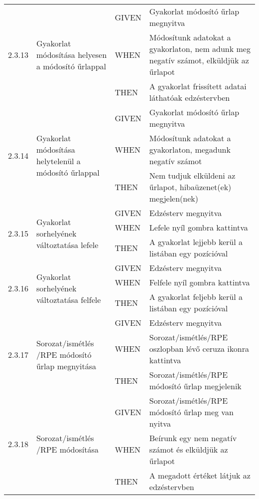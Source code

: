 \begin{center}
\begin{longtable}{ | p{} | p{} | p{} | p{} | }
			\multirow{3}{*}{2.3.13} 
			& \multirow{3}{=}{Gyakorlat módosítása helyesen a módosító űrlappal} 
			& GIVEN 
			& Gyakorlat módosító űrlap megnyitva \\
			\cline{3-4}
			& & WHEN 
			& Módosítunk adatokat a gyakorlaton, nem adunk meg negatív számot, elküldjük az űrlapot \\
			\cline{3-4}
			& & THEN 
			& A gyakorlat frissített adatai láthatóak edzéstervben \\
			\hline

			\multirow{3}{*}{2.3.14} 
			& \multirow{3}{=}{Gyakorlat módosítása helytelenül a módosító űrlappal} 
			& GIVEN 
			& Gyakorlat módosító űrlap megnyitva \\
			\cline{3-4}
			& & WHEN 
			& Módosítunk adatokat a gyakorlaton, megadunk negatív számot \\
			\cline{3-4}
			& & THEN 
			& Nem tudjuk elküldeni az űrlapot, hibaüzenet(ek) megjelen(nek) \\
			\hline

			\multirow{3}{*}{2.3.15} 
			& \multirow{3}{=}{Gyakorlat sorhelyének változtatása lefele} 
			& GIVEN 
			& Edzésterv megnyitva \\
			\cline{3-4}
			& & WHEN 
			& Lefele nyíl gombra kattintva \\
			\cline{3-4}
			& & THEN 
			& A gyakorlat lejjebb kerül a listában egy pozícióval \\
			\hline

			\multirow{3}{*}{2.3.16} 
			& \multirow{3}{=}{Gyakorlat sorhelyének változtatása felfele} 
			& GIVEN 
			& Edzésterv megnyitva \\
			\cline{3-4}
			& & WHEN 
			& Felfele nyíl gombra kattintva \\
			\cline{3-4}
			& & THEN 
			& A gyakorlat feljebb kerül a listában egy pozícióval \\
			\hline

			\multirow{3}{*}{2.3.17} 
			& \multirow{3}{=}{Sorozat/ismétlés /RPE módosító űrlap megnyitása} 
			& GIVEN 
			& Edzésterv megnyitva \\
			\cline{3-4}
			& & WHEN 
			& Sorozat/ismétlés/RPE oszlopban lévő ceruza ikonra kattintva \\
			\cline{3-4}
			& & THEN 
			& Sorozat/ismétlés/RPE módosító űrlap megjelenik \\
			\hline

			\multirow{3}{*}{2.3.18} 
			& \multirow{3}{=}{Sorozat/ismétlés /RPE módosítása} 
			& GIVEN 
			& Sorozat/ismétlés/RPE módosító űrlap meg van nyitva \\
			\cline{3-4}
			& & WHEN 
			& Beírunk egy nem negatív számot és elküldjük az űrlapot \\
			\cline{3-4}
			& & THEN 
			& A megadott értéket látjuk az edzéstervben \\
			\hline


\end{longtable}
\end{center}
